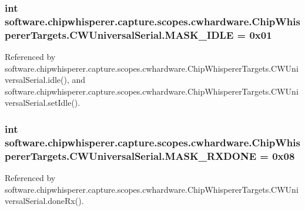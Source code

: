 \subsubsection[{M\+A\+S\+K\+\_\+\+I\+D\+L\+E}]{\setlength{\rightskip}{0pt plus 5cm}int software.\+chipwhisperer.\+capture.\+scopes.\+cwhardware.\+Chip\+Whisperer\+Targets.\+C\+W\+Universal\+Serial.\+M\+A\+S\+K\+\_\+\+I\+D\+L\+E = 0x01\hspace{0.3cm}{\ttfamily [static]}}\label{classsoftware_1_1chipwhisperer_1_1capture_1_1scopes_1_1cwhardware_1_1ChipWhispererTargets_1_1CWUniversalSerial_a5478d4af915910a6ddfd68564935eb12}


Referenced by software.\+chipwhisperer.\+capture.\+scopes.\+cwhardware.\+Chip\+Whisperer\+Targets.\+C\+W\+Universal\+Serial.\+idle(), and software.\+chipwhisperer.\+capture.\+scopes.\+cwhardware.\+Chip\+Whisperer\+Targets.\+C\+W\+Universal\+Serial.\+set\+Idle().

\hypertarget{classsoftware_1_1chipwhisperer_1_1capture_1_1scopes_1_1cwhardware_1_1ChipWhispererTargets_1_1CWUniversalSerial_a61457a238eb45fb18b84619a82cb4de8}{}
\subsubsection[{M\+A\+S\+K\+\_\+\+R\+X\+D\+O\+N\+E}]{\setlength{\rightskip}{0pt plus 5cm}int software.\+chipwhisperer.\+capture.\+scopes.\+cwhardware.\+Chip\+Whisperer\+Targets.\+C\+W\+Universal\+Serial.\+M\+A\+S\+K\+\_\+\+R\+X\+D\+O\+N\+E = 0x08\hspace{0.3cm}{\ttfamily [static]}}\label{classsoftware_1_1chipwhisperer_1_1capture_1_1scopes_1_1cwhardware_1_1ChipWhispererTargets_1_1CWUniversalSerial_a61457a238eb45fb18b84619a82cb4de8}


Referenced by software.\+chipwhisperer.\+capture.\+scopes.\+cwhardware.\+Chip\+Whisperer\+Targets.\+C\+W\+Universal\+Serial.\+done\+Rx().

